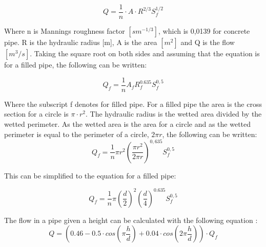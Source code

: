 \begin{equation}
	Q=\frac{1}{n} \cdot A\cdot R^{2/3} S_f^{1/2}			
\end{equation}

Where n is Mannings roughness factor $[sm^{-1/3}]$, which is 0,0139 for concrete pipe. R is the hydraulic radius [m], A is the area $[m^2]$ and Q is the flow $[m^3/s]$. Taking the square root on both sides and assuming that the equation is for a filled pipe, the following can be written:

\begin{equation}
  Q_{f} = \frac{1}{n} A_{f} R_{f}^{0.635}S_f^{0,5} 
\end{equation}


Where the subscript f denotes for filled pipe. For a filled pipe the area is the cross section for a circle is $\pi \cdot r^2$. The hydraulic radius is the wetted area divided by the wetted perimeter. As the wetted area is the area for a circle and as the wetted perimeter is equal to the perimeter of a circle, $2\pi r$, the following can be written: 
\begin{equation}
		Q_{f}= \frac{1}{n}\pi r^2\left(\frac{\pi r^2}{2\pi r}\right)^{0,635} S_f^{0,5} 
\end{equation}

This can be simplified to the equation for a filled pipe:

\begin{equation}%
	Q_{f} =\frac{1}{n}\pi\left(\frac{d}{2}\right)^2\left(\frac{d}{4}\right)^{0.635} S_f^{0,5}%
\end{equation}


The flow in a pipe given a height can be calculated with the following equation \cite{ikke_stationear}:
\begin{equation}%
 	Q = \left(0.46-0.5 \cdot cos\left(\pi \frac{h}{d}\right)+0.04\cdot cos\left(2\pi\frac{h}{d}\right)\right)\cdot Q_f
\end{equation}

